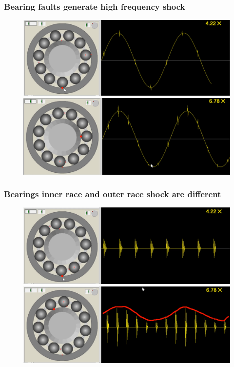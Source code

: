 \documentclass{beamer}
\begin{document}
\begin{frame}
	\frametitle{Bearing faults generate high frequency shock}
	\begin{figure}[H]
		\centering
		\includegraphics[width=0.8\linewidth]{outer-race1}
		\includegraphics[width=0.8\linewidth]{inner-race1}
	\end{figure}
\end{frame}

\begin{frame}
	\frametitle{Bearings inner race and outer race shock are different}
	\begin{figure}[H]
		\centering
		\includegraphics[width=0.8\linewidth]{outer-race2}
		\includegraphics[width=0.8\linewidth]{inner-race2}
	\end{figure}
\end{frame}
\end{document}
